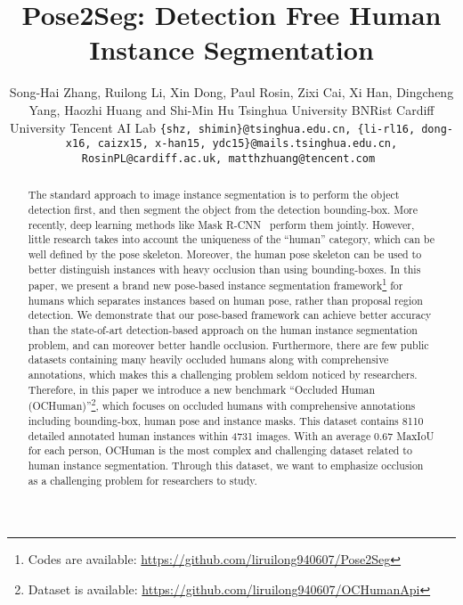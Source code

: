 \documentclass[10pt,twocolumn,letterpaper]{article}
\begin{document}
\title{Pose2Seg: Detection Free Human Instance Segmentation}



\author{
Song-Hai Zhang, Ruilong Li, Xin Dong, Paul Rosin, Zixi Cai, Xi Han,  Dingcheng Yang, Haozhi Huang and Shi-Min Hu 
\vskip 0.3cm 
 Tsinghua University  \quad  BNRist \quad  Cardiff University   \quad   Tencent AI Lab 
\vskip 0.2cm
{\tt\footnotesize \{shz, shimin\}@tsinghua.edu.cn, \{li-rl16, dong-x16, caizx15, x-han15, ydc15\}@mails.tsinghua.edu.cn, RosinPL@cardiff.ac.uk, matthzhuang@tencent.com
}
}

\maketitle


\begin{abstract}
The standard approach to image instance segmentation is to perform the object detection first, and then segment the object from the detection bounding-box. More recently, deep learning methods like Mask R-CNN~\cite{He2017Mask} perform them jointly. However, little research takes into account the uniqueness of the ``human'' category, which can be well defined by the pose skeleton. Moreover, the human pose skeleton can be used to better distinguish instances with heavy occlusion than using bounding-boxes. In this paper, we present a brand new pose-based instance segmentation framework\footnote{Codes are available: \href{https://github.com/liruilong940607/Pose2Seg}{https://github.com/liruilong940607/Pose2Seg}} for humans which separates instances based on human pose, rather than proposal region detection. We demonstrate that our pose-based framework can achieve better accuracy than the state-of-art detection-based approach on the human instance segmentation problem, and can moreover better handle occlusion.
Furthermore, there are few public datasets containing many heavily occluded humans along with comprehensive annotations, 
which makes this a challenging problem seldom noticed by researchers. 
Therefore, in this paper we introduce a new benchmark ``Occluded Human ({OCHuman})''\footnote{Dataset is available: \href{https://github.com/liruilong940607/OCHumanApi}{https://github.com/liruilong940607/OCHumanApi}}, which focuses on occluded humans with comprehensive annotations including bounding-box, human pose and instance masks.  This dataset contains 8110 detailed annotated human instances within 4731 images. With an average 0.67 {MaxIoU} for each person, {OCHuman} is the most complex and challenging dataset related to human instance segmentation. Through this dataset, we want to emphasize occlusion as a challenging problem for researchers to study.

\end{abstract}
 
\end{document}

